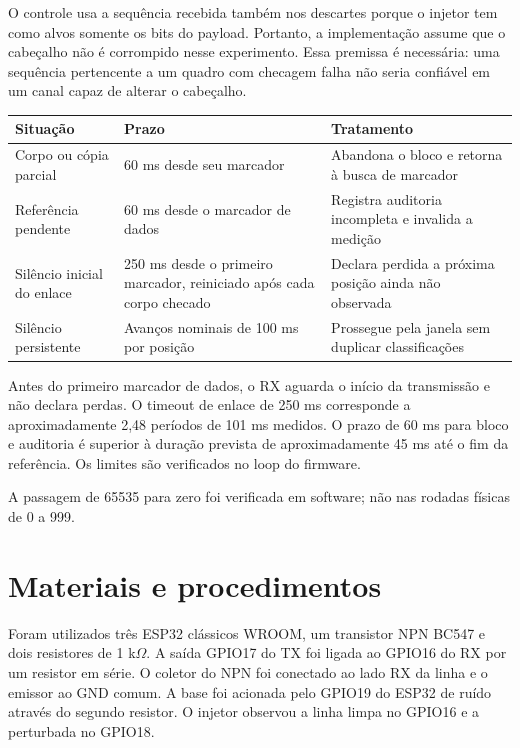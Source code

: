\documentclass[12pt,a4paper]{article}
\begin{document}
O controle usa a sequência recebida também nos descartes porque o injetor tem como alvos somente os bits do payload. Portanto, a implementação assume que o cabeçalho não é corrompido nesse experimento. Essa premissa é necessária: uma sequência pertencente a um quadro com checagem falha não seria confiável em um canal capaz de alterar o cabeçalho.


\par\smallskip\noindent\begin{minipage}{\textwidth}\centering\small
{}
\begin{tabularx}{\textwidth}{@{}P{.21\linewidth} P{.31\linewidth} Y@{}}\toprule
\textbf{Situação} & \textbf{Prazo} & \textbf{Tratamento}\\\midrule
Corpo ou cópia parcial & 60 ms desde seu marcador & Abandona o bloco e retorna à busca de marcador\\
Referência pendente & 60 ms desde o marcador de dados & Registra auditoria incompleta e invalida a medição\\
Silêncio inicial do enlace & 250 ms desde o primeiro marcador, reiniciado após cada corpo checado & Declara perdida a próxima posição ainda não observada\\
Silêncio persistente & Avanços nominais de 100 ms por posição & Prossegue pela janela sem duplicar classificações\\
\bottomrule\end{tabularx}
\par{}\end{minipage}\par\smallskip

Antes do primeiro marcador de dados, o RX aguarda o início da transmissão e não declara perdas. O timeout de enlace de 250 ms corresponde a aproximadamente 2,48 períodos de 101 ms medidos. O prazo de 60 ms para bloco e auditoria é superior à duração prevista de aproximadamente 45 ms até o fim da referência. Os limites são verificados no loop do firmware.

A passagem de 65535 para zero foi verificada em software; não nas rodadas físicas de 0 a 999.

\FloatBarrier
\clearpage
\section{Materiais e procedimentos}
Foram utilizados três ESP32 clássicos WROOM, um transistor NPN BC547 e dois resistores de 1 k\ensuremath{\Omega}. A saída GPIO17 do TX foi ligada ao GPIO16 do RX por um resistor em série. O coletor do NPN foi conectado ao lado RX da linha e o emissor ao GND comum. A base foi acionada pelo GPIO19 do ESP32 de ruído através do segundo resistor. O injetor observou a linha limpa no GPIO16 e a perturbada no GPIO18.
\end{document}

